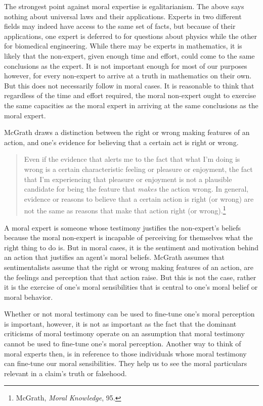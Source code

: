 \documentclass[phdthesis,12pt,final]{wuthesis}
\theoremstyle{definition}
\theoremstyle{definition}
\theoremstyle{definition}
\theoremstyle{definition}
\theoremstyle{remark}
\begin{document}
The strongest point against moral expertise is egalitarianism. The above says nothing about universal laws and their applications. Experts in two different fields may indeed have access to the same set of facts, but because of their applications, one expert is deferred to for questions about physics while the other for biomedical engineering. While there may be experts in mathematics, it is likely that the non-expert, given enough time and effort, could come to the same conclusions as the expert. It is not important enough for most of our purposes however, for every non-expert to arrive at a truth in mathematics on their own. But this does not necessarily follow in moral cases. It is reasonable to think that regardless of the time and effort required, the moral non-expert ought to exercise the same capacities as the moral expert in arriving at the same conclusions as the moral expert.

McGrath draws a distinction between the right or wrong making features of an action, and one's evidence for believing that a certain act is right or wrong.

\begin{quote}
Even if the evidence that alerts me to the fact that what I'm doing is wrong is a certain characteristic feeling or pleasure or enjoyment, the fact that I'm experiencing that pleasure or enjoyment is not a plausible candidate for being the feature that \emph{makes} the action wrong. In general, evidence or reasons to believe that a certain action is right (or wrong) are not the same as reasons that make that action right (or wrong).\footnote{McGrath, \emph{Moral {Knowledge}}, 95.}
\end{quote}

A moral expert is someone whose testimony justifies the non-expert's beliefs because the moral non-expert is incapable of perceiving for themselves what the right thing to do is. But in moral cases, it is the sentiment and motivation behind an action that justifies an agent's moral beliefs. McGrath assumes that sentimentalists assume that the right or wrong making features of an action, are the feelings and perception that that action raise. But this is not the case, rather it is the exercise of one's moral sensibilities that is central to one's moral belief or moral behavior.

Whether or not moral testimony can be used to fine-tune one's moral perception is important, however, it is not as important as the fact that the dominant criticisms of moral testimony operate on an assumption that moral testimony cannot be used to fine-tune one's moral perception. Another way to think of moral experts then, is in reference to those individuals whose moral testimony can fine-tune our moral sensibilities. They help us to see the moral particulars relevant in a claim's truth or falsehood.
\end{document}
